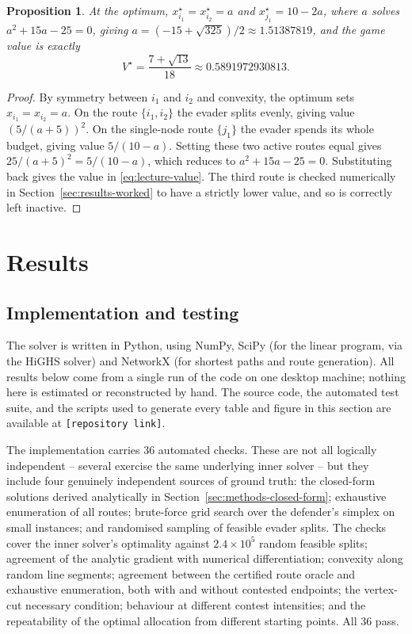 \documentclass[11pt,a4paper]{article}
\theoremstyle{plain}
\newtheorem{proposition}[theorem]{Proposition}
\theoremstyle{definition}
\begin{document}
\begin{proposition}
\label{prop:lecture}
At the optimum, $x^{\star}_{i_1}=x^{\star}_{i_2}=a$ and
$x^{\star}_{j_1}=10-2a$, where $a$ solves $a^2+15a-25=0$, giving
$a=(-15+\sqrt{325})/2\approx1.51387819$, and the game value is exactly
\begin{equation}
  V^{\star}=\frac{7+\sqrt{13}}{18}\approx0.5891972930813.
  \label{eq:lecture-value}
\end{equation}
\end{proposition}
\begin{proof}
By symmetry between $i_1$ and $i_2$ and convexity, the optimum sets
$x_{i_1}=x_{i_2}=a$. On the route $\{i_1,i_2\}$ the evader splits evenly,
giving value $(5/(a+5))^2$. On the single-node route $\{j_1\}$ the evader
spends its whole budget, giving value $5/(10-a)$. Setting these two
active routes equal gives $25/(a+5)^2=5/(10-a)$, which reduces to
$a^2+15a-25=0$. Substituting back gives the value in
\eqref{eq:lecture-value}. The third route is checked numerically in
Section~\ref{sec:results-worked} to have a strictly lower value, and so is
correctly left inactive.
\end{proof}

\section{Results}
\label{sec:results}

\subsection{Implementation and testing}

The solver is written in Python, using NumPy, SciPy (for the linear
program, via the HiGHS solver) and NetworkX (for shortest paths and route
generation). All results below come from a single run of the code on one
desktop machine; nothing here is estimated or reconstructed by hand. The
source code, the automated test suite, and the scripts used to generate
every table and figure in this section are available at
\texttt{[repository link]}.

The implementation carries 36 automated checks. These are not all
logically independent -- several exercise the same underlying inner
solver -- but they include four genuinely independent sources of ground
truth: the closed-form solutions derived analytically in
Section~\ref{sec:methods-closed-form}; exhaustive enumeration of all
routes; brute-force grid search over the defender's simplex on small
instances; and randomised sampling of feasible evader splits. The checks
cover the inner solver's optimality against $2.4\times10^5$ random
feasible splits; agreement of the analytic gradient with numerical
differentiation; convexity along random line segments; agreement between
the certified route oracle and exhaustive enumeration, both with and
without contested endpoints; the vertex-cut necessary condition;
behaviour at different contest intensities; and the repeatability of the
optimal allocation from different starting points. All 36 pass.
\end{document}
